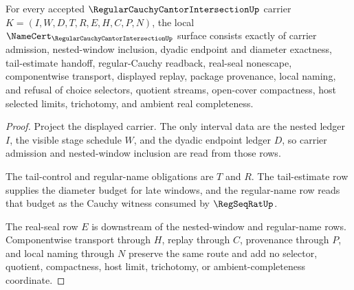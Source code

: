 \begin{theorem}
\label{thm:regular-cauchy-cantor-intersection-namecert-obligations}
For every accepted $\RegularCauchyCantorIntersectionUp$ carrier $K=(I,W,D,T,R,E,H,C,P,N)$, the local $\NameCert_{\RegularCauchyCantorIntersectionUp}$ surface consists exactly of carrier admission, nested-window inclusion, dyadic endpoint and diameter exactness, tail-estimate handoff, regular-Cauchy readback, real-seal nonescape, componentwise transport, displayed replay, package provenance, local naming, and refusal of choice selectors, quotient streams, open-cover compactness, host selected limits, trichotomy, and ambient real completeness.
\end{theorem}
\begin{proof}
Project the displayed carrier. The only interval data are the nested ledger $I$, the visible stage schedule $W$, and the dyadic endpoint ledger $D$, so carrier admission and nested-window inclusion are read from those rows.

The tail-control and regular-name obligations are $T$ and $R$. The tail-estimate row supplies the diameter budget for late windows, and the regular-name row reads that budget as the Cauchy witness consumed by $\RegSeqRatUp$.

The real-seal row $E$ is downstream of the nested-window and regular-name rows. Componentwise transport through $H$, replay through $C$, provenance through $P$, and local naming through $N$ preserve the same route and add no selector, quotient, compactness, host limit, trichotomy, or ambient-completeness coordinate.
\end{proof}

